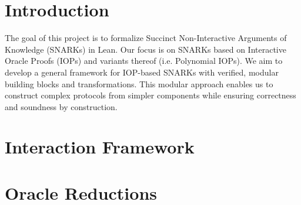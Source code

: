 %

\chapter{Introduction}

The goal of this project is to formalize Succinct Non-Interactive Arguments of Knowledge (SNARKs) in
Lean. Our focus is on SNARKs based on Interactive Oracle Proofs (IOPs) and variants thereof (i.e.
Polynomial IOPs). We aim to develop a general framework for IOP-based SNARKs with verified, modular
building blocks and transformations. This modular approach enables us to construct complex protocols
from simpler components while ensuring correctness and soundness by construction.

\chapter{Interaction Framework}\label{chap:interaction}















\chapter{Oracle Reductions}\label{chap:oracle_reductions}





